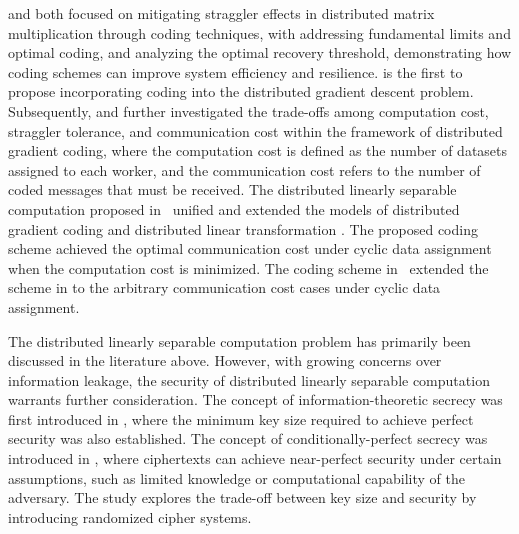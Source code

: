 \documentclass[conference,letterpaper]{IEEEtran}
\begin{document}

\cite{yu2020straggler} and \cite{Straggler_2} both focused on mitigating straggler effects in distributed matrix multiplication through coding techniques, with \cite{yu2020straggler} addressing fundamental limits and optimal coding, and \cite{Straggler_2} analyzing the optimal recovery threshold, demonstrating how coding schemes can improve system efficiency and resilience.
\cite{pmlr-v70-tandon17a} is the first to propose incorporating coding into the distributed gradient descent problem. Subsequently, \cite{ye2018communication} and \cite{Jahani2021OptimalCommunication-Computation} further investigated the trade-offs among computation cost, straggler tolerance, and communication cost within the framework of distributed gradient coding, where the computation cost is defined as the number of datasets assigned to each worker, and the communication cost refers to the number of coded messages that must be received.
The distributed linearly separable computation proposed in~\cite{m=1} unified and extended the models of distributed gradient coding \cite{pmlr-v70-tandon17a} and distributed linear transformation \cite{Short-dot}. The proposed coding scheme achieved the optimal communication cost under cyclic data assignment when the computation cost is minimized. The coding scheme in~\cite{limit} extended the scheme in \cite{m=1} to the arbitrary communication cost cases under cyclic data assignment.

The distributed linearly separable computation problem has primarily been discussed in the literature above. However, with growing concerns over information leakage, the security of distributed linearly separable computation warrants further consideration. 
The concept of information-theoretic secrecy was first introduced in \cite{Shannon}, where the minimum key size required to achieve perfect security was also established. The concept of conditionally-perfect secrecy was introduced in \cite{maurer1992conditionally}, where ciphertexts can achieve near-perfect security under certain assumptions, such as limited knowledge or computational capability of the adversary. The study explores the trade-off between key size and security by introducing randomized cipher systems.
\end{document}
